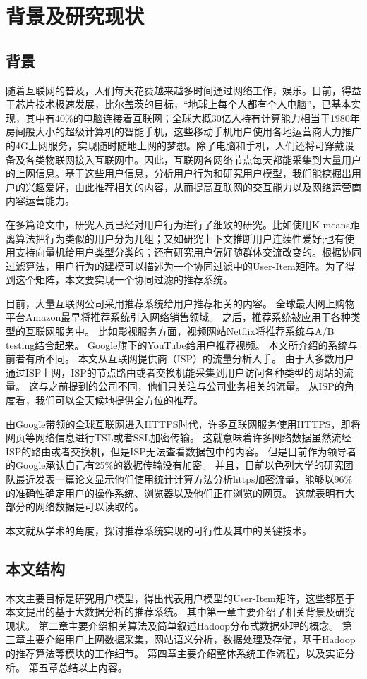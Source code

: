 \chapter{背景及研究现状}

\section{背景}
随着互联网的普及，人们每天花费越来越多时间通过网络工作，娱乐。目前，得益于芯片技术极速发展，比尔盖茨的目标，“地球上每个人都有个人电脑”，已基本实现，其中有40\%的电脑连接着互联网；全球大概30亿人持有计算能力相当于1980年房间般大小的超级计算机的智能手机，这些移动手机用户使用各地运营商大力推广的4G上网服务，实现随时随地上网的梦想。除了电脑和手机，人们还将可穿戴设备及各类物联网接入互联网中。因此，互联网各网络节点每天都能采集到大量用户的上网信息。基于这些用户信息，分析用户行为和研究用户模型，我们能挖掘出用户的兴趣爱好，由此推荐相关的内容，从而提高互联网的交互能力以及网络运营商内容运营能力。

在多篇论文中，研究人员已经对用户行为进行了细致的研究。比如使用K-means距离算法\parencite{杨清龙2013基于网络日志的互联网用户行为分析}把行为类似的用户分为几组；又如研究上下文推断用户连续性爱好\parencite{史艳翠2013基于通信数据的上下文移动用户偏好动态获取方法研究};也有使用支持向量机给用户类型分类的\parencite{史艳翠2013基于通信数据的上下文移动用户偏好动态获取方法研究}；还有研究用户偏好随群体交流改变的\parencite{张欢2014网络用户偏好分析方法的研究,程辉2013网络用户偏好分析及话题趋势预测方法研究}。根据协同过滤算法\parencite{resnick1994grouplens}，用户行为的建模可以描述为一个协同过滤中的User-Item矩阵。为了得到这个矩阵，本文要实现一个协同过滤的推荐系统。

目前，大量互联网公司采用推荐系统给用户推荐相关的内容。
全球最大网上购物平台Amazon最早将推荐系统引入网络销售领域\parencite{Linden2010Amazon}。
之后，推荐系统被应用于各种类型的互联网服务中。
比如影视服务方面，视频网站Netflix将推荐系统与A/B testing结合起来\parencite{Gomez2015The}。
Google旗下的YouTube给用户推荐视频\parencite{Davidson2010The}。
本文所介绍的系统与前者有所不同。
本文从互联网提供商（ISP）的流量分析入手。
由于大多数用户通过ISP上网，ISP的节点路由或者交换机能采集到用户访问各种类型的网站的流量。
这与之前提到的公司不同，他们只关注与公司业务相关的流量。
从ISP的角度看，我们可以全天候地提供全方位的推荐。

由Google带领的全球互联网进入HTTPS时代，许多互联网服务使用HTTPS，即将网页等网络信息进行TSL或者SSL加密传输。
这就意味着许多网络数据虽然流经ISP的路由或者交换机，但是ISP无法查看数据包中的内容。
但是目前作为领导者的Google承认自己有25\%的数据传输没有加密。
并且，日前以色列大学的研究团队最近发表一篇论文显示他们使用统计计算方法分析https加密流量，能够以96\%的准确性确定用户的操作系统、浏览器以及他们正在浏览的网页。
这就表明有大部分的网络数据是可以读取的。

本文就从学术的角度，探讨推荐系统实现的可行性及其中的关键技术。

\section{本文结构}
本文主要目标是研究用户模型，得出代表用户模型的User-Item矩阵，这些都基于本文提出的基于大数据分析的推荐系统。
其中第一章主要介绍了相关背景及研究现状。
第二章主要介绍相关算法及简单叙述Hadoop分布式数据处理的概念。
第三章主要介绍用户上网数据采集，网站语义分析，数据处理及存储，基于Hadoop的推荐算法等模块的工作细节。
第四章主要介绍整体系统工作流程，以及实证分析。
第五章总结以上内容。